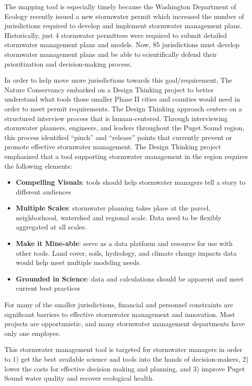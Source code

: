 \documentclass[
]{report}
\begin{document}
The mapping tool is especially timely because the Washington Department of Ecology recently issued a new stormwater permit which increased the number of jurisdictions required to develop and implement stormwater management plans. Historically, just 4 stormwater permittees were required to submit detailed stormwater management plans and models. Now, 85 jurisdictions must develop stormwater management plans and be able to scientifically defend their prioritization and decision-making process.

In order to help move more jurisdictions towards this goal/requirement, The Nature Conservancy embarked on a Design Thinking project to better understand what tools those smaller Phase II cities and counties would need in order to meet permit requirements. The Design Thinking approach centers on a structured interview process that is human-centered. Through interviewing stormwater planners, engineers, and leaders throughout the Puget Sound region, this process identified ``pinch'' and ``release'' points that currently prevent or promote effective stormwater management. The Design Thinking project emphasized that a tool supporting stormwater management in the region requires the following elements:

\begin{itemize}
\item
  \textbf{Compelling Visuals}: tools should help stormwater managers tell a story to different audiences
\item
  \textbf{Multiple Scales}: stormwater planning takes place at the parcel, neighborhood, watershed and regional scale. Data need to be flexibly aggregated at all scales.
\item
  \textbf{Make it Mine-able}: serve as a data platform and resource for use with other tools. Land cover, soils, hydrology, and climate change impacts data would help meet multiple modeling needs.
\item
  \textbf{Grounded in Science}: data and calculations should be apparent and meet current best practices
\end{itemize}

For many of the smaller jurisdictions, financial and personnel constraints are significant barriers to effective stormwater management and innovation. Most projects are opportunistic, and many stormwater management departments have only one employee.

This stormwater management tool is targeted for stormwater managers in order to 1) get the best available science and tools into the hands of decision-makers, 2) lower the costs for effective decision making and planning, and 3) improve Puget Sound water quality and recover ecological health.
\end{document}
